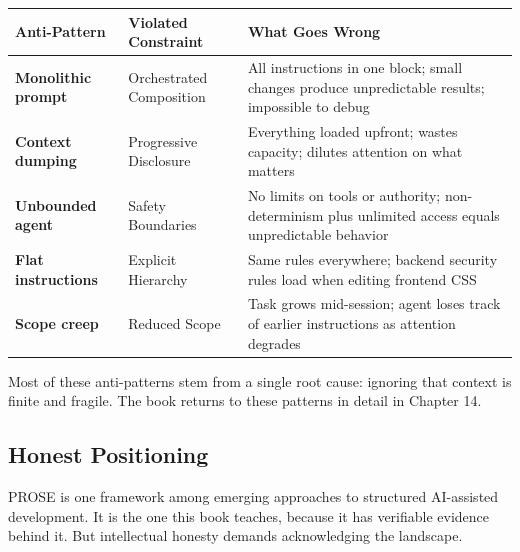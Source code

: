 \documentclass[
  a4paper,
  DIV=11,
  numbers=noendperiod]{scrreprt}
\newcounter{none} %
\begin{document}
{\def\LTcaptype{none} %
\begin{longtable}[]{@{}
  >{\raggedright\arraybackslash}p{}
  >{\raggedright\arraybackslash}p{}
  >{\raggedright\arraybackslash}p{}@{}}
\toprule\noalign{}
\begin{minipage}[b]{\linewidth}\raggedright
Anti-Pattern
\end{minipage} & \begin{minipage}[b]{\linewidth}\raggedright
Violated Constraint
\end{minipage} & \begin{minipage}[b]{\linewidth}\raggedright
What Goes Wrong
\end{minipage} \\
\midrule\noalign{}
\endhead
\bottomrule\noalign{}
\endlastfoot
\textbf{Monolithic prompt} & Orchestrated Composition & All instructions
in one block; small changes produce unpredictable results; impossible to
debug \\
\textbf{Context dumping} & Progressive Disclosure & Everything loaded
upfront; wastes capacity; dilutes attention on what matters \\
\textbf{Unbounded agent} & Safety Boundaries & No limits on tools or
authority; non-determinism plus unlimited access equals unpredictable
behavior \\
\textbf{Flat instructions} & Explicit Hierarchy & Same rules everywhere;
backend security rules load when editing frontend CSS \\
\textbf{Scope creep} & Reduced Scope & Task grows mid-session; agent
loses track of earlier instructions as attention degrades \\
\end{longtable}
}

Most of these anti-patterns stem from a single root cause: ignoring that
context is finite and fragile. The book returns to these patterns in
detail in Chapter 14.

\subsection{Honest Positioning}\label{honest-positioning}

PROSE is one framework among emerging approaches to structured
AI-assisted development. It is the one this book teaches, because it has
verifiable evidence behind it. But intellectual honesty demands
acknowledging the landscape.
\end{document}
